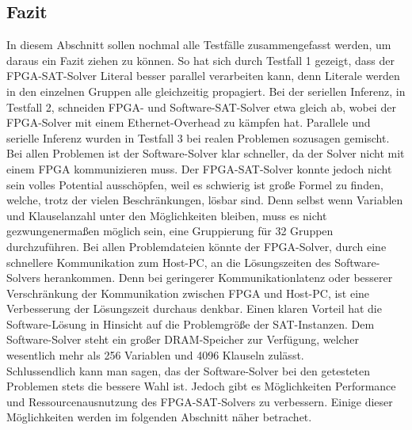 \subsection{Fazit}
In diesem Abschnitt sollen nochmal alle Testfälle zusammengefasst
werden, um daraus ein Fazit ziehen zu können. So hat sich durch
Testfall 1 gezeigt, dass der FPGA-SAT-Solver Literal besser
parallel verarbeiten kann, denn Literale werden in den einzelnen
Gruppen alle gleichzeitig propagiert. Bei der seriellen Inferenz, 
in Testfall 2, schneiden FPGA- und Software-SAT-Solver etwa gleich ab, wobei
der FPGA-Solver mit einem Ethernet-Overhead zu kämpfen hat.
Parallele und serielle Inferenz wurden in Testfall 3 bei
realen Problemen sozusagen gemischt. Bei allen Problemen
ist der Software-Solver klar schneller, da der Solver nicht 
mit einem FPGA kommunizieren muss. Der FPGA-SAT-Solver konnte
jedoch nicht sein volles Potential ausschöpfen, weil
es schwierig ist große Formel zu finden,
welche, trotz der vielen Beschränkungen, lösbar sind. Denn selbst
wenn Variablen und Klauselanzahl unter den Möglichkeiten bleiben, 
muss es nicht gezwungenermaßen möglich sein, 
eine Gruppierung für 32 Gruppen durchzuführen.
Bei allen Problemdateien könnte der FPGA-Solver,
durch eine schnellere Kommunikation zum Host-PC, an die Lösungszeiten
des Software-Solvers herankommen.
Denn bei geringerer Kommunikationlatenz oder
besserer Verschränkung der Kommunikation zwischen FPGA und Host-PC, ist eine
Verbesserung der Lösungszeit
durchaus denkbar. 
Einen klaren Vorteil hat die Software-Lösung
in Hinsicht auf die Problemgröße der SAT-Instanzen. Dem 
Software-Solver steht ein großer DRAM-Speicher zur Verfügung, welcher
wesentlich mehr als 256 Variablen und 4096 Klauseln zulässt.\\
Schlussendlich kann man sagen, das der Software-Solver
bei den getesteten Problemen stets die bessere Wahl ist. Jedoch
gibt es Möglichkeiten Performance und Ressourcenausnutzung
des FPGA-SAT-Solvers zu verbessern. Einige dieser Möglichkeiten werden im
folgenden Abschnitt näher betrachet.






